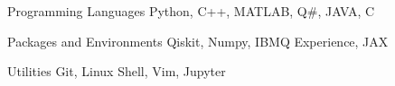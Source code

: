 

\begin{cvskills}

  \cvskill
    {Programming Languages} %
    {Python, C++, MATLAB, Q\#, JAVA, C} %

  \cvskill
    {Packages and Environments} %
    {Qiskit, Numpy, IBMQ Experience, JAX} %
    

  \cvskill
    {Utilities} %
    {Git, Linux Shell, Vim, Jupyter} %



    
    
  

\end{cvskills}
